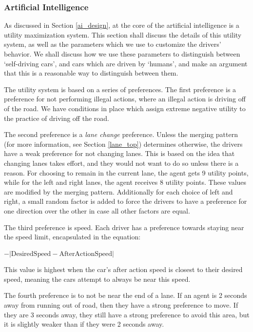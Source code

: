 \documentclass[a4paper, 11pt]{article}
\begin{document}
\subsubsection{Artificial Intelligence}
\label{ai_impl}

As discussed in Section \ref{ai_design}, at the core of the artificial intelligence is a utility maximization system. This section shall discuss the details of this utility system, as well as the parameters which we use to customize the drivers' behavior. We shall discuss how we use these parameters to distinguish between `self-driving cars', and cars which are driven by `humans', and make an argument that this is a reasonable way to distinguish between them. 

The utility system is based on a series of preferences. The first preference is a preference for not performing illegal actions, where an illegal action is driving off of the road. We have conditions in place which assign extreme negative utility to the practice of driving off the road. 

The second preference is a \textit{lane change} preference. 
Unless the merging pattern (for more information, see Section \ref{lane_top}) determines otherwise, the drivers have a weak preference for not changing lanes. This is based on the idea that changing lanes takes effort, and they would not want to do so unless there is a reason. For choosing to remain in the current lane, the agent gets 9 utility points, while for the left and right lanes, the agent receives 8 utility points. These values are modified by the merging pattern. Additionally for each choice of left and right, a small random factor is added to force the drivers to have a preference for one direction over the other in case all other factors are equal. 

The third preference is speed. Each driver has a preference towards staying near the speed limit, encapsulated in the equation:

\begin{center}
$-|\mbox{DesiredSpeed} - \mbox{AfterActionSpeed}|$
\end{center}

This value is highest when the car's after action speed is closest to their desired speed, meaning the cars attempt to always be near this speed. 

The fourth preference is to not be near the end of a lane. If an agent is 2 seconds away from running out of road, then they have a strong preference to move. If they are 3 seconds away, they still have a strong preference to avoid this area, but it is slightly weaker than if they were 2 seconds away.
\end{document}
